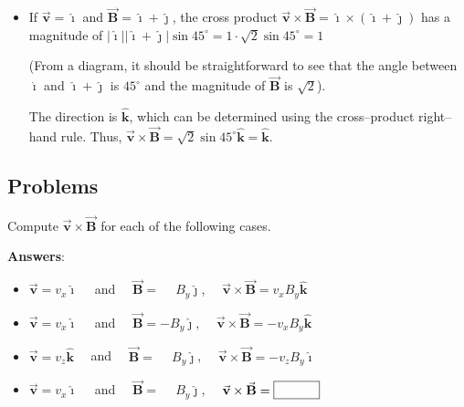 \documentclass{article}
\newcommand{\ihat}[0]{\hat{\boldsymbol{\imath}}}
\newcommand{\jhat}[0]{\hat{\boldsymbol{\jmath}}}
\newcommand{\khat}[0]{\hat{\boldsymbol{k}}}
\newcommand{\bfvec}[1]{\vec{\mathbf{#1}}}
\begin{document}
\begin{enumerate}
\begin{itemize}
        \item If $\bfvec{v}=\ihat$ and $\bfvec{B}=\ihat+\jhat$, the cross product $\bfvec{v}\times\bfvec{B}= \ihat\times(\ihat+\jhat)$ has a magnitude of $|\ihat||\ihat+\jhat|\sin 45^\circ = 1\cdot \sqrt{2} \sin 45^\circ = 1$

              (From a diagram, it should be straightforward to see that the angle between $\ihat$ and $\ihat+\jhat$ is $45^\circ$ and the magnitude of $\bfvec{B}$ is $\sqrt{2}$).

              The direction is $\khat$, which can be determined using the cross--product right--hand rule. Thus, $\bfvec{v}\times\bfvec{B}=\sqrt{2} \sin 45^\circ\khat = \khat$.

      \end{itemize}

\end{enumerate}

\ifsolutions

\else

\newpage
\fi

\subsection{Problems}

Compute $\bfvec{v}\times\bfvec{B}$ for each of the following cases.

\ifsolutions
\textbf{Answers}:

    \begin{itemize}

      \item $\bfvec{v}=v_x\ihat\quad$ and $\quad\bfvec{B}=\phantom{-}B_y\jhat$, $\quad\bfvec{v}\times\bfvec{B} = \boxed{v_xB_y\khat}$

      \item $\bfvec{v}=v_x\ihat\quad$ and $\quad\bfvec{B}=-B_y\jhat$, $\quad\bfvec{v}\times\bfvec{B} = \boxed{-v_xB_y\khat}$

      \item $\bfvec{v}=v_z\khat\quad$ and $\quad\bfvec{B}=\phantom{-}B_y\jhat$, $\quad\bfvec{v}\times\bfvec{B} = \boxed{-v_zB_y\ihat}$

    \end{itemize}
\else
\vskip 60pt

    \begin{itemize}

      \item $\bfvec{v}=v_x\ihat\quad$ and $\quad\bfvec{B}=\phantom{-}B_y\jhat$, $\quad\bfvec{v}\times\bfvec{B} = \fbox{\qquad\phantom M}$

    \end{itemize}
\end{document}
